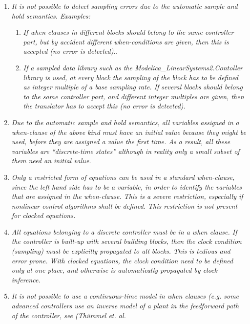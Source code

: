 \documentclass[10pt,a4paper]{report}
\renewcommand{\labelenumi}{\arabic{enumi}.}
\renewcommand{\labelenumii}{\labelenumi\arabic{enumii}.}
\begin{document}
\begin{enumerate}
\def\labelenumi{\arabic{enumi}.}
\item
  \emph{It is not possible to detect sampling errors due to the
  automatic sample and hold semantics. Examples: }

  \begin{enumerate}
  \def\labelenumii{\alph{enumii}.}
  \item
    \emph{If when-clauses in different blocks should belong to the same
    controller part, but by accident different when-conditions are
    given, then this is accepted (no error is detected)..}
  \item
    \emph{If a sampled data library such as the
    Modelica\_LinearSystems2.Contoller library is used, at every block
    the sampling of the block has to be defined as integer multiple of a
    base sampling rate. If several blocks should belong to the same
    controller part, and different integer multiples are given, then the
    translator has to accept this (no error is detected).}
  \end{enumerate}
\item
  \emph{Due to the automatic sample and hold semantics, all variables
  assigned in a when-clause of the above kind must have an initial value
  because they might be used, before they are assigned a value the first
  time. As a result, all these variables are ``discrete-time states''
  although in reality only a small subset of them need an initial
  value.}
\item
  \emph{Only a restricted form of equations can be used in a standard
  when-clause, since the left hand side has to be a variable, in order
  to identify the variables that are assigned in the when-clause. This
  is a severe restriction, especially if nonlinear control algorithms
  shall be defined. This restriction is not present for clocked
  equations.}
\item
  \emph{All equations belonging to a discrete controller must be in a
  when clause. If the controller is built-up with several building
  blocks, then the clock condition (sampling) must be explicitly
  propagated to all blocks. This is tedious and error prone. With
  clocked equations, the clock condition need to be defined only at one
  place, and otherwise is automatically propagated by clock inference.}
\item
  \emph{It is not possible to use a continuous-time model in when
  clauses (e.g. some advanced controllers use an inverse model of a
  plant in the feedforward path of the controller, see (Thümmel et. al.
}
\end{enumerate}
\end{document}
